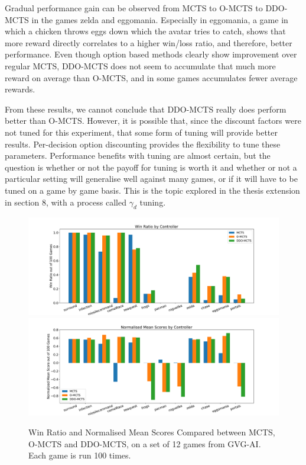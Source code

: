 \documentclass[12pt,a4paper]{article}
\begin{document}
\begin{multicols}{2}
Gradual performance gain can be observed from MCTS to O-MCTS to DDO-MCTS in the games zelda and eggomania. Especially in eggomania, a game in which a chicken throws eggs down which the avatar tries to catch, shows that more reward directly correlates to a higher win/loss ratio, and therefore, better performance. Even though option based methods clearly show improvement over regular MCTS, DDO-MCTS does not seem to accumulate that much more reward on average than O-MCTS, and in some games accumulates fewer average rewards.

From these results, we cannot conclude that DDO-MCTS really does perform better than O-MCTS. However, it is possible that, since the discount factors were not tuned for this experiment, that some form of tuning will provide better results. Per-decision option discounting provides the flexibility to tune these parameters. Performance benefits with tuning are almost certain, but the question is whether or not the payoff for tuning is worth it and whether or not a particular setting will generalise well against many games, or if it will have to be tuned on a game by game basis. This is the topic explored in the thesis extension in section 8, with a process called $\gamma_d$ tuning.

\begin{figure}
    \centering
    \includegraphics[width=\linewidth]{win_ratio_main.pdf}
    \includegraphics[width=\linewidth]{mean_scores_main.pdf}
    \caption{Win Ratio and Normalised Mean Scores Compared between MCTS, O-MCTS and DDO-MCTS, on a set of 12 games from GVG-AI. Each game is run 100 times.}
    \label{fig:thesis-res}
\end{figure}


\end{multicols}
\end{document}
